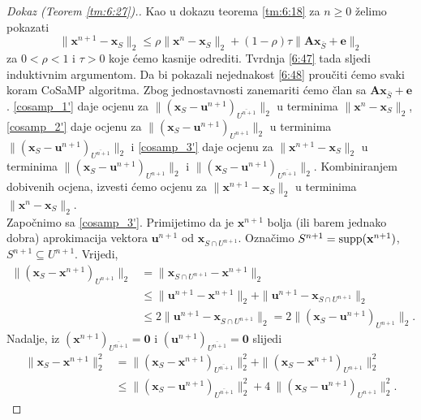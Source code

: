 \documentclass[a4paper,twoside,12pt]{memoir} %
\newcommand{\vect}[1]{\mathbf{#1}}
\renewcommand{\vec}{\vect}
\newcommand{\supp}{\text{\normalfont{supp}}}
\newcommand{\norm}[1]{\|{#1}\|}
\begin{document}
\begin{proof}[Dokaz (Teorem \ref{tm:6:27}).]
    Kao u dokazu teorema \eqref{tm:6:18} za $n \geq 0$ \v{z}elimo pokazati
    \begin{equation}\label{6:48}
        \norm{\vec x^{n+1} - \vec x_S}_2 \leq \rho \norm{\vec x^n - \vec x_S}_2 + (1-\rho)\tau \norm{\vec{Ax}_{\bar S} + \vec e}_2 
    \end{equation}
    za $0< \rho < 1$ i $\tau > 0 $ koje \'cemo kasnije odrediti. Tvrdnja \eqref{6:47} tada sljedi induktivnim argumentom. Da bi pokazali nejednakost \eqref{6:48} prou\v{c}iti \'cemo svaki koram CoSaMP algoritma. Zbog jednostavnosti zanemariti \'cemo \v{c}lan sa $\vec{Ax}_{\bar S} + \vec e$. \eqref{cosamp_1'} daje ocjenu za $\norm{(\vec x_S - \vec u^{n+1})_{\overline{U^{n+1}}}}_2$ u terminima $\norm{\vec x^n - \vec x_S}_2$, \eqref{cosamp_2'} daje ocjenu za $\norm{(\vec x_S - \vec u^{n+1})_{U^{n+1}}}_2$ u terminima $\norm{(\vec x_S - \vec u^{n+1})_{\overline{U^{n+1}}}}_2$ i \eqref{cosamp_3'} daje ocjenu za $\norm{\vec x^{n+1}  - \vec x_S}_2$ u terminima $\norm{(\vec x_S - \vec u^{n+1})_{U^{n+1}}}_2$ i $\norm{(\vec x_S - \vec u^{n+1})_{\overline{U^{n+1}}}}_2$. Kombiniranjem dobivenih ocjena, izvesti \'cemo ocjenu za $\norm{\vec x^{n+1} - \vec x_S}_2$ u terminima $\norm{\vec x^n - \vec x_S}_2$.\\
    \indent
    Zapo\v{c}nimo sa \eqref{cosamp_3'}. Primijetimo da je $\vec x^{n+1}$ bolja (ili barem jednako dobra) aprokimacija vektora $\vec u^{n+1}$ od $\vec x_{S \cap U^{n+1}}$. Ozna\v{c}imo $S^{n+1}= \supp(\vec x^{n+1})$, $S^{n+1} \subseteq U^{n+1}$. Vrijedi,
    \begin{align*}
        \norm{(\vec x_S - \vec x^{n+1})_{U^{n+1}}}_2 &= \norm{\vec x_{S \cap U^{n+1}} - \vec x^{n+1}}_2\\[0.5em]
        & \leq \norm{\vec u^{n+1} - \vec x^{n+1}}_2 + \norm{\vec u^{n+1} - \vec x_{S \cap U^{n+1}}}_2\\[0.5em]
        & \leq 2 \norm{\vec u^{n+1} - \vec x_{S \cap U^{n+1}}}_2 = 2 \norm{(\vec x_S - \vec u ^{n+1})_{U^{n+1}}}_2.
    \end{align*}
    Nadalje, iz $(\vec x^{n+1})_{\overline{U^{n+1}}} = \vec 0$ i $(\vec u^{n+1})_{\overline{U^{n+1}}} = \vec 0$ slijedi
    \begin{align}
        \norm{\vec x_S - \vec x^{n+1}}_2^2 & = \norm{(\vec x_S - \vec x^{n+1})_{\overline{U^{n+1}}}}_2^2 + \norm{(\vec x_S - \vec x^{n+1})_{U^{n+1}}}_2^2 \nonumber \\[0.5em]
        & \leq \norm{(\vec x_S - \vec u^{n+1})_{\overline{U^{n+1}}}}_2^2 + 4\ \norm{(\vec x_S - \vec u^{n+1})_{U^{n+1}}}_2^2. \label{6:49}

\end{align}
\end{proof}
\end{document}
